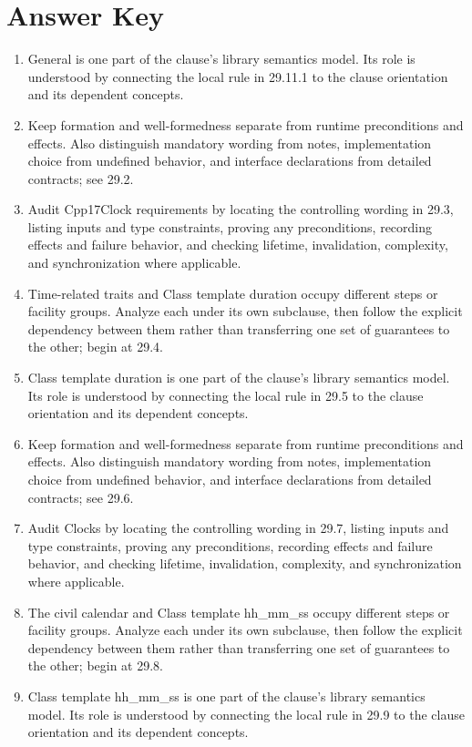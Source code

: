 \documentclass[11pt,letterpaper]{article}
\begin{document}
\clearpage\section{Answer Key}
\begin{enumerate}
\item General is one part of the clause's library semantics model. Its role is understood by connecting the local rule in 29.11.1 to the clause orientation and its dependent concepts.
\item Keep formation and well-formedness separate from runtime preconditions and effects. Also distinguish mandatory wording from notes, implementation choice from undefined behavior, and interface declarations from detailed contracts; see 29.2.
\item Audit Cpp17Clock requirements by locating the controlling wording in 29.3, listing inputs and type constraints, proving any preconditions, recording effects and failure behavior, and checking lifetime, invalidation, complexity, and synchronization where applicable.
\item Time-related traits and Class template duration occupy different steps or facility groups. Analyze each under its own subclause, then follow the explicit dependency between them rather than transferring one set of guarantees to the other; begin at 29.4.
\item Class template duration is one part of the clause's library semantics model. Its role is understood by connecting the local rule in 29.5 to the clause orientation and its dependent concepts.
\item Keep formation and well-formedness separate from runtime preconditions and effects. Also distinguish mandatory wording from notes, implementation choice from undefined behavior, and interface declarations from detailed contracts; see 29.6.
\item Audit Clocks by locating the controlling wording in 29.7, listing inputs and type constraints, proving any preconditions, recording effects and failure behavior, and checking lifetime, invalidation, complexity, and synchronization where applicable.
\item The civil calendar and Class template hh\_\allowbreak{}mm\_\allowbreak{}ss occupy different steps or facility groups. Analyze each under its own subclause, then follow the explicit dependency between them rather than transferring one set of guarantees to the other; begin at 29.8.
\item Class template hh\_\allowbreak{}mm\_\allowbreak{}ss is one part of the clause's library semantics model. Its role is understood by connecting the local rule in 29.9 to the clause orientation and its dependent concepts.

\end{enumerate}
\end{document}
